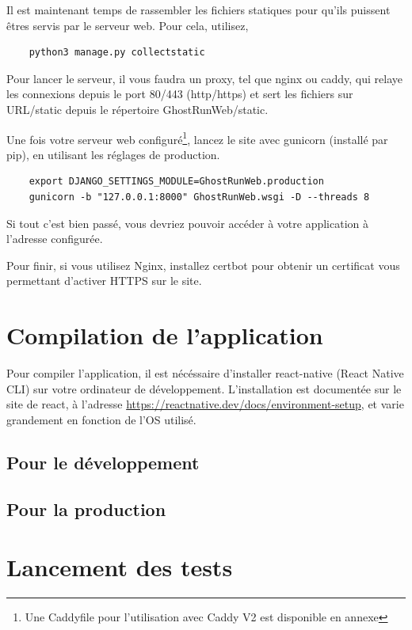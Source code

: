 Il est maintenant temps de rassembler les fichiers statiques pour qu'ils puissent êtres servis par le serveur web. Pour cela, utilisez,

\begin{verbatim}
    python3 manage.py collectstatic
\end{verbatim}

Pour lancer le serveur, il vous faudra un proxy, tel que nginx ou caddy, qui relaye les connexions depuis le port 80/443 (http/https) et sert les fichiers sur URL/static depuis le répertoire GhostRunWeb/static.

Une fois votre serveur web configuré\footnote{Une Caddyfile pour l'utilisation avec Caddy V2 est disponible en annexe}, lancez le site avec gunicorn (installé par pip), en utilisant les réglages de production.

\begin{verbatim}
    export DJANGO_SETTINGS_MODULE=GhostRunWeb.production
    gunicorn -b "127.0.0.1:8000" GhostRunWeb.wsgi -D --threads 8
\end{verbatim}

Si tout c'est bien passé, vous devriez pouvoir accéder à votre application à l'adresse configurée.

Pour finir, si vous utilisez Nginx, installez certbot pour obtenir un certificat vous permettant d'activer HTTPS sur le site.


\section{Compilation de l'application}

Pour compiler l'application, il est nécéssaire d'installer react-native (React Native CLI) sur votre ordinateur de développement. L'installation est documentée sur le site de react, à l'adresse \url{https://reactnative.dev/docs/environment-setup}, et varie grandement en fonction de l'OS utilisé.

\subsection{Pour le développement}

\subsection{Pour la production}


\section{Lancement des tests}

